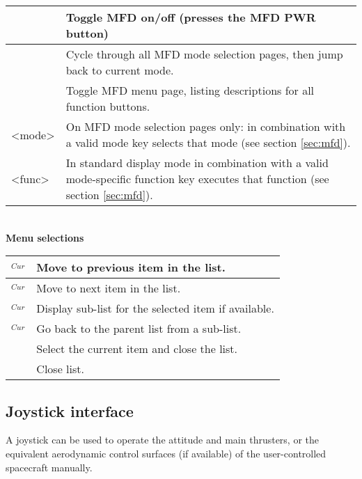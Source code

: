 \documentclass[Orbiter User Manual.tex]{subfiles}
\begin{document}
	\begin{longtable}{ |p{}|p{}| }
	\hline\rule{0pt}{2ex}
	\Shift\keystroke{Esc} & Toggle MFD on/off (presses the MFD PWR button)\\
	\hline\rule{0pt}{2ex}
	\Shift\keystroke{F1} & Cycle through all MFD mode selection pages, then jump back to current mode.\\
	\hline\rule{0pt}{2ex}
	\Shift\keystroke{'} & Toggle MFD menu page, listing descriptions for all function buttons.\\
	\hline\rule{0pt}{2ex}
	\Shift<mode> & On MFD mode selection pages only: \Shift in combination with a valid mode key selects that mode (see section \ref{sec:mfd}).\\
	\hline\rule{0pt}{2ex}
	\Shift<func> & In standard display mode \Shift in combination with a valid mode-specific function key executes that function (see section \ref{sec:mfd}).\\
	\hline
	\end{longtable}

\noindent
\\
\textbf{Menu selections}

	\begin{longtable}{ |p{}|p{}| }
	\hline\rule{0pt}{2ex}
	\UArrow$_{Cur}$ & Move to previous item in the list.\\
	\hline\rule{0pt}{2ex}
	\DArrow$_{Cur}$ & Move to next item in the list.\\
	\hline\rule{0pt}{2ex}
	\RArrow$_{Cur}$ & Display sub-list for the selected item if available.\\
	\hline\rule{0pt}{2ex}
	\LArrow$_{Cur}$ & Go back to the parent list from a sub-list.\\
	\hline\rule{0pt}{2ex}
	\Enter & Select the current item and close the list.\\
	\hline\rule{0pt}{2ex}
	\keystroke{Esc} & Close list.\\
	\hline
	\end{longtable}


\subsection{Joystick interface}
A joystick can be used to operate the attitude and main thrusters, or the equivalent aerodynamic control surfaces (if available) of the user-controlled spacecraft manually.
\end{document}
